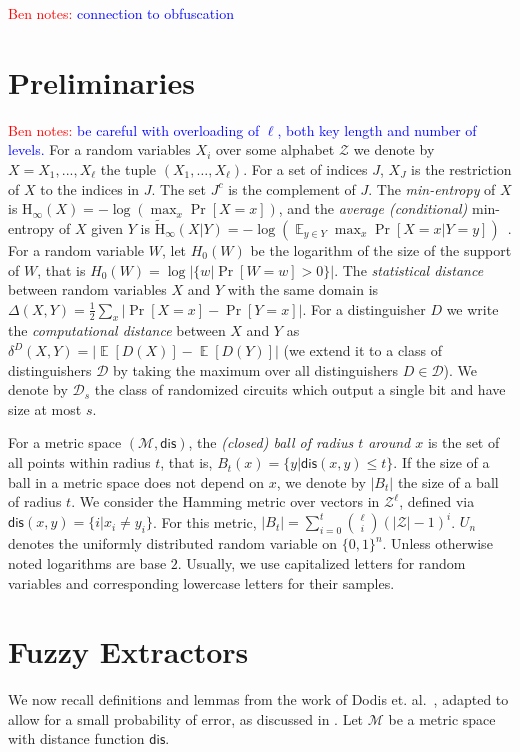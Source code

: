 \documentclass[11pt]{article}
\DeclareMathOperator*{\expe}{\mathbb{E}}
\newcommand{\dis}{\ensuremath{\mathsf{dis}}}
\newcommand{\Hoo}{\mathrm{H}_\infty}
\newcommand{\Hav}{\tilde{\mathrm{H}}_\infty}
\newcommand{\authnote}[2]{{\textcolor{red}{\textsf{#1 notes: }\textcolor{blue}{ #2}}\marginpar{\textcolor{red}{\textbf{!!!!!}}}}}
\newcommand{\authnote}[2]{}
\newcommand{\bnote}[1]{{\authnote{Ben}{#1}}}
\begin{document}
\bnote{connection to obfuscation}
\section{Preliminaries}
\label{sec:preliminaries}
\bnote{be careful with overloading of $\ell$, both key length and number of levels.}
For a random variables $X_i$ over some alphabet $\mathcal{Z}$ we denote by $X = X_1,..., X_\ell$  the tuple $(X_1,\dots, X_\ell)$.  For a set of indices $J$, $X_{J}$ is the restriction of $X$ to the indices in $J$.  The set $J^c$ is the complement of $J$.  The {\em min-entropy} of $X$ is $\Hoo(X) = -\log(\max_x \Pr[X=x])$,
and the {\em average (conditional)} min-entropy of $X$ given $Y$ is  $\Hav(X|Y) = -\log(\expe_{y\in Y} \max_{x} \Pr[X=x|Y=y])$~\cite[Section 2.4]{DBLP:journals/siamcomp/DodisORS08}.   For a random variable $W$, let $H_0(W)$ be the logarithm of the size of the support of $W$,  that is $H_0(W) = \log |\{w | \Pr[W=w]>0\}|$.
The {\em statistical distance} between random variables $X$ and $Y$ with the same domain is $\Delta(X,Y) = \frac12 \sum_x |\Pr[X=x] - \Pr[Y=x]|$.
For a distinguisher $D$ we write the \emph{computational distance} between $X$ and $Y$ as $\delta^D(X,Y) = \left| \expe[D(X)]-\expe[D(Y)]\right |$ (we extend it to a class of distinguishers $\mathcal{D}$ by taking the maximum over all distinguishers $D\in\mathcal{D}$).  We denote by $\mathcal{D}_{s}$ the class of randomized circuits which output a single bit and have size at most $s$.

For a metric space $(\mathcal{M}, \dis)$, the \emph{(closed) ball of radius $t$ around $x$} is the set of all points within radius $t$, that is, $B_t(x) = \{y| \dis(x, y)\leq t\}$.  If the size of a ball in a metric space does not depend on $x$, we denote by $|B_t|$ the size of a ball of radius $t$.  We consider the Hamming metric over vectors in $\mathcal{Z}^\ell$, defined via $\dis(x,y) = \{i | x_i \neq y_i\}$.  For this metric, $|B_t| = \sum_{i=0}^t {\ell \choose i} (|\mathcal{Z}|-1)^i $.  $U_n$ denotes the uniformly  distributed random variable on $\{0,1\}^n$.  Unless otherwise noted logarithms are base $2$.
Usually, we use capitalized letters for random variables and corresponding lowercase letters for their samples.

\section{Fuzzy Extractors}\label{sec:fuzz extractor}

We now recall definitions and lemmas from the work of Dodis et. al.~\cite[Sections 2.5--4.1]{DBLP:journals/siamcomp/DodisORS08}, adapted to allow for a small probability of error, as discussed in \cite[Sections 8]{DBLP:journals/siamcomp/DodisORS08}.  Let $\mathcal{M}$ be a metric space with distance function $\dis$.
\end{document}
